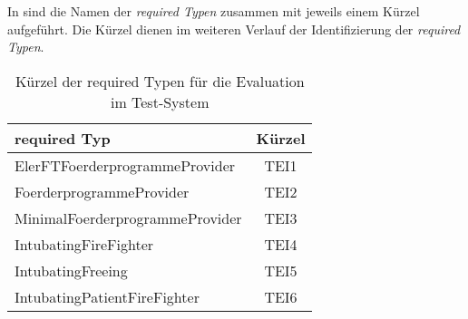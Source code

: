 %
%
%
In  sind die Namen der \emph{required Typen} zusammen mit jeweils einem Kürzel aufgeführt. Die Kürzel dienen im weiteren Verlauf der Identifizierung der \emph{required Typen}.
\begin{table}[h!]
\centering
\small
\begin{tabular}{|l|c|}
\hline
\hline
\centering\textbf{required Typ} & \textbf{Kürzel} \\
\hline
\hline
ElerFTFoerderprogrammeProvider & TEI1\\
\hline
FoerderprogrammeProvider & TEI2\\
\hline
MinimalFoerderprogrammeProvider & TEI3\\
\hline
IntubatingFireFighter & TEI4\\
\hline
IntubatingFreeing & TEI5\\
\hline
IntubatingPatientFireFighter & TEI6\\
\hline
\hline
\end{tabular}
\caption{Kürzel der required Typen für die Evaluation im Test-System}
 \label{tab:eIShort}
\end{table}
\noindent
